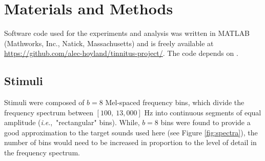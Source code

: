 \documentclass[journal]{IEEEtran}
\newcommand{\ie}{\textit{i}.\textit{e}.,\ }
\begin{document}
% 
% 
% 
% 


\section{Materials and Methods }

Software code used for the experiments and analysis was written in MATLAB (Mathworks, Inc., Natick, Massachusetts)
and is freely available at \protect\url{https://github.com/alec-hoyland/tinnitus-project/}.
The code depends on \cite{bechtoldViolinPlotsMatlab2022,kochYaml2022,gorur-shandilyaSrinivasGsMtools2022}.

\subsection{Stimuli}

Stimuli were composed of $b=8$ Mel-spaced frequency bins,
which divide the frequency spectrum between $[100,~13,000]$
Hz into continuous segments of equal amplitude (\ie "rectangular" bins).
While, $b=8$ bins were found to provide a good approximation to the target sounds used here (see Figure \ref{fig:spectra}),
the number of bins would need to be increased in proportion to the level of detail in the frequency spectrum.
\end{document}
